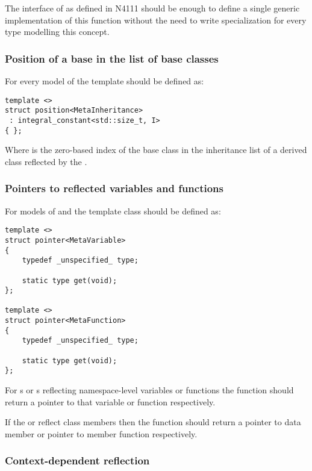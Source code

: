 The interface of  as defined in N4111 should be enough
to define a single generic implementation of this function without the need
to write specialization for every type modelling this concept.

\subsubsection{Position of a base in the list of base classes}

For every model of  the \verb@position@ template should be defined as:

\begin{verbatim}
template <>
struct position<MetaInheritance>
 : integral_constant<std::size_t, I>
{ };
\end{verbatim}

Where \verb@I@ is the zero-based index of the base class in the inheritance list of a derived class
reflected by the .

\subsubsection{Pointers to reflected variables and functions}

For models of  and  the \verb@pointer@ template class
should be defined as:

\begin{verbatim}
template <>
struct pointer<MetaVariable>
{
	typedef _unspecified_ type;

	static type get(void);
};

template <>
struct pointer<MetaFunction>
{
	typedef _unspecified_ type;

	static type get(void);
};
\end{verbatim}

For s or s reflecting namespace-level variables or functions
the \verb@get@ function should return a pointer to that variable or function respectively.

If the  or  reflect class members then the \verb@get@ function
should return a pointer to data member or pointer to member function respectively.

\subsubsection{Context-dependent reflection}

